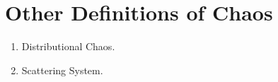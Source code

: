 \documentclass[12pt,twoside,draft]{book}
\begin{document}
\chapter{Other Definitions of Chaos}
\begin{enumerate}
  \item Distributional Chaos\citep{dchaos1}\citep{dchaos2}.
  \item Scattering System\citep{blanchard2}.
\end{enumerate}




\printindex
\end{document}
